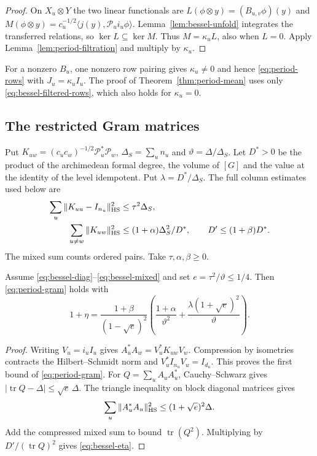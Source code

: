 \begin{proof}
On $X_u\otimes Y$ the two linear functionals are
$L(\phi\otimes y)=(B_{u,v}\phi)(y)$ and
$M(\phi\otimes y)=c_u^{-1/2}\langle j(y),\mathcal P_u i_u\phi\rangle$.
Lemma~\ref{lem:bessel-unfold} integrates the transferred relations,
so $\ker L\subseteq\ker M$. Thus $M=\kappa_u L$, also when $L=0$.
Apply Lemma~\ref{lem:period-filtration} and multiply by $\kappa_u$.
\end{proof}

For a nonzero $B_u$, one nonzero row pairing gives $\kappa_u\ne0$
and hence \eqref{eq:period-rows} with $J_u=\kappa_u I_u$.
The proof of Theorem~\ref{thm:period-mean} uses only
\eqref{eq:bessel-filtered-rows}, which also holds for $\kappa_u=0$.

\subsection{The restricted Gram matrices}

Put $K_{uw}=(c_uc_w)^{-1/2}\mathcal P_u^*\mathcal P_w$,
$\Delta_S=\sum_u n_u$ and $\vartheta=\Delta/\Delta_S$.
Let $D^*>0$ be the product of the archimedean formal degree, the
volume of $[G]$ and the value at the identity of the level idempotent.
Put $\lambda=D^*/\Delta_S$. The full column estimates used below are
\begin{align}
 \sum_u\|K_{uu}-I_{n_u}\|_{\rm HS}^2
    &\le\tau^2\Delta_S,\label{eq:bessel-diag}\\
 \sum_{u\ne w}\|K_{uw}\|_{\rm HS}^2
    &\le (1+\alpha)\Delta_S^2/D^*,\qquad
       D'\le(1+\beta)D^* .\label{eq:bessel-mixed}
\end{align}
The mixed sum counts ordered pairs. Take $\tau,\alpha,\beta\ge0$.

\begin{lemma}\label{lem:bessel-compression}
Assume \eqref{eq:bessel-diag}--\eqref{eq:bessel-mixed} and set
$e=\tau^2/\vartheta\le1/4$. Then \eqref{eq:period-gram} holds with
\begin{equation}\label{eq:bessel-eta}
 1+\eta=\frac{1+\beta}{(1-\sqrt e)^2}
 \left(\frac{1+\alpha}{\vartheta^2}
                  +\frac{\lambda(1+\sqrt e)^2}{\vartheta}\right).
\end{equation}
\end{lemma}

\begin{proof}
Writing $V_u=i_uI_u$ gives $A_u^*A_w=V_u^*K_{uw}V_w$.
Compression by isometries contracts the Hilbert--Schmidt norm and
$V_u^*I_{n_u}V_u=I_{d_u}$. This proves the first bound of
\eqref{eq:period-gram}. For $Q=\sum_u A_uA_u^*$, Cauchy--Schwarz gives
$|\operatorname{tr}Q-\Delta|\le\sqrt e\,\Delta$.
The triangle inequality on block diagonal matrices gives
\[
 \sum_u\|A_u^*A_u\|_{\rm HS}^2\le(1+\sqrt e)^2\Delta.
\]
Add the compressed mixed sum to bound $\operatorname{tr}(Q^2)$.
Multiplying by $D'/(\operatorname{tr}Q)^2$ gives \eqref{eq:bessel-eta}.
\end{proof}

